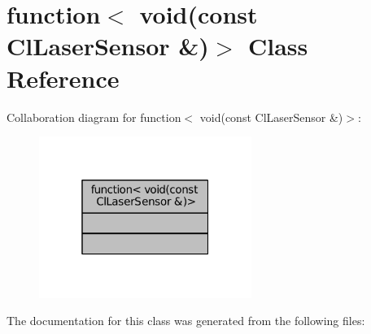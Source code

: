 \hypertarget{classstd_1_1function_3_01void_07const_01ClLaserSensor_01_6_08_4}{}\section{function$<$ void(const Cl\+Laser\+Sensor \&)$>$ Class Reference}
\label{classstd_1_1function_3_01void_07const_01ClLaserSensor_01_6_08_4}


Collaboration diagram for function$<$ void(const Cl\+Laser\+Sensor \&)$>$\+:
\nopagebreak
\begin{figure}[H]
\begin{center}
\leavevmode
\includegraphics[width=196pt]{classstd_1_1function_3_01void_07const_01ClLaserSensor_01_6_08_4__coll__graph}
\end{center}
\end{figure}


The documentation for this class was generated from the following files\+: